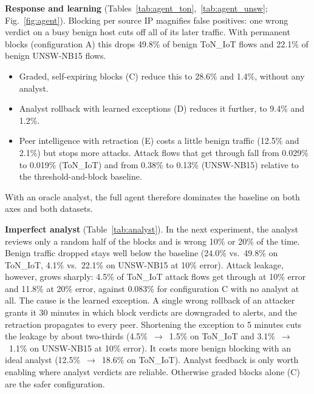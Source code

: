 \textbf{Response and learning} (Tables~\ref{tab:agent_ton},~\ref{tab:agent_unsw};
Fig.~\ref{fig:agent}). Blocking per source IP magnifies false positives: one
wrong verdict on a busy benign host cuts off all of its later traffic. With
permanent blocks (configuration A) this drops 49.8\% of benign ToN\_IoT flows
and 22.1\% of benign UNSW-NB15 flows.
\begin{itemize}
\item Graded, self-expiring blocks (C) reduce this to 28.6\% and 1.4\%,
without any analyst.
\item Analyst rollback with learned exceptions (D) reduces it further, to 9.4\% and 1.2\%.
\item Peer intelligence with retraction (E) costs a little benign traffic
(12.5\% and 2.1\%) but stops more attacks. Attack flows that get through fall
from 0.029\% to 0.019\% (ToN\_IoT) and from 0.38\% to 0.13\% (UNSW-NB15)
relative to the threshold-and-block baseline.
\end{itemize}
With an oracle analyst, the full agent therefore dominates the baseline on
both axes and both datasets.

\textbf{Imperfect analyst} (Table~\ref{tab:analyst}). In the next experiment,
the analyst reviews only a random half of the blocks and is wrong 10\% or
20\% of the time. Benign traffic dropped stays well below the baseline
(24.0\% vs.\ 49.8\% on ToN\_IoT, 4.1\% vs.\ 22.1\% on UNSW-NB15 at 10\% error).
Attack leakage, however, grows sharply: 4.5\% of ToN\_IoT attack flows get
through at 10\% error and 11.8\% at 20\% error, against 0.083\% for
configuration C with no analyst at all. The cause is the learned exception. A
single wrong rollback of an attacker grants it 30 minutes in which block
verdicts are downgraded to alerts, and the retraction propagates to every
peer. Shortening the exception to 5 minutes cuts the leakage by about
two-thirds (4.5\%~$\rightarrow$~1.5\% on ToN\_IoT and 3.1\%~$\rightarrow$~1.1\%
on UNSW-NB15 at 10\% error). It costs more benign blocking with an ideal
analyst (12.5\%~$\rightarrow$~18.6\% on ToN\_IoT). Analyst feedback is only
worth enabling where analyst verdicts are reliable. Otherwise graded blocks
alone (C) are the safer configuration.

